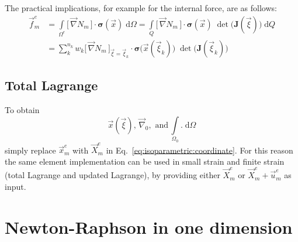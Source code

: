 \documentclass[times,namecite]{goose-article}
\begin{document}
The practical implications, for example for the internal force, are as follows:
\begin{align}
  \vec{f}_m^e
  &=
  \int\limits_{\Omega^e}
    \big[\, \vec{\nabla} N_m \,\big]
    \cdot
    \bm{\sigma}(\vec{x}) \;
  \mathrm{d}\Omega
  =
  \int\limits_{Q}
    \big[\, \vec{\nabla} N_m \,\big]
    \cdot
    \bm{\sigma}(\vec{x}) \;
    \det \big( \bm{J}(\vec{\xi}) \big) \;
  \mathrm{d}Q
  \\
  &=
  \sum_{k}^{n_k}
  w_k
  \big[\, \vec{\nabla} N_m \,\big]_{\vec{\xi} = \vec{\xi}_k}
  \cdot
  \bm{\sigma}\big(\vec{x}(\vec{\xi}_k)\big) \;
  \det \big( \bm{J}(\vec{\xi}_k) \big) \;
\end{align}

\subsection*{Total Lagrange}

To obtain
\begin{equation}
 \vec{x}(\vec{\xi}),\, \vec{\nabla}_0,\,\, \text{and}\, \int\limits_{\Omega_0} . \;\mathrm{d}\Omega
\end{equation}
simply replace $\vec{x}_m^e$ with $\vec{X}_m^e$ in Eq.~\eqref{eq:isoparametric:coordinate}. For this reason the same element implementation can be used in small strain and finite strain (total Lagrange and updated Lagrange), by providing either $\vec{X}_m^e$ or $\vec{X}_m^e + \vec{u}_m^e$ as input.


\section{Newton-Raphson in one dimension}
\label{sec:newton-raphson}
\end{document}
